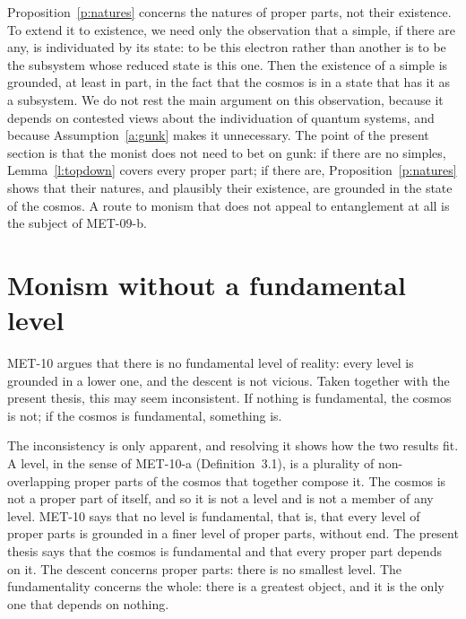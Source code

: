 \documentclass{situationist-preprint}
\begin{document}
Proposition~\ref{p:natures} concerns the natures of proper parts, not their existence. To extend it to existence, we need only the observation that a simple, if there are any, is individuated by its state: to be this electron rather than another is to be the subsystem whose reduced state is this one. Then the existence of a simple is grounded, at least in part, in the fact that the cosmos is in a state that has it as a subsystem. We do not rest the main argument on this observation, because it depends on contested views about the individuation of quantum systems, and because Assumption~\ref{a:gunk} makes it unnecessary. The point of the present section is that the monist does not need to bet on gunk: if there are no simples, Lemma~\ref{l:topdown} covers every proper part; if there are, Proposition~\ref{p:natures} shows that their natures, and plausibly their existence, are grounded in the state of the cosmos. A route to monism that does not appeal to entanglement at all is the subject of MET-09-b.

\section{Monism without a fundamental level}\label{s:levels}

MET-10 argues that there is no fundamental level of reality: every level is grounded in a lower one, and the descent is not vicious. Taken together with the present thesis, this may seem inconsistent. If nothing is fundamental, the cosmos is not; if the cosmos is fundamental, something is.

The inconsistency is only apparent, and resolving it shows how the two results fit. A level, in the sense of MET-10-a (Definition~3.1), is a plurality of non-overlapping proper parts of the cosmos that together compose it. The cosmos is not a proper part of itself, and so it is not a level and is not a member of any level. MET-10 says that no level is fundamental, that is, that every level of proper parts is grounded in a finer level of proper parts, without end. The present thesis says that the cosmos is fundamental and that every proper part depends on it. The descent concerns proper parts: there is no smallest level. The fundamentality concerns the whole: there is a greatest object, and it is the only one that depends on nothing.
\end{document}
